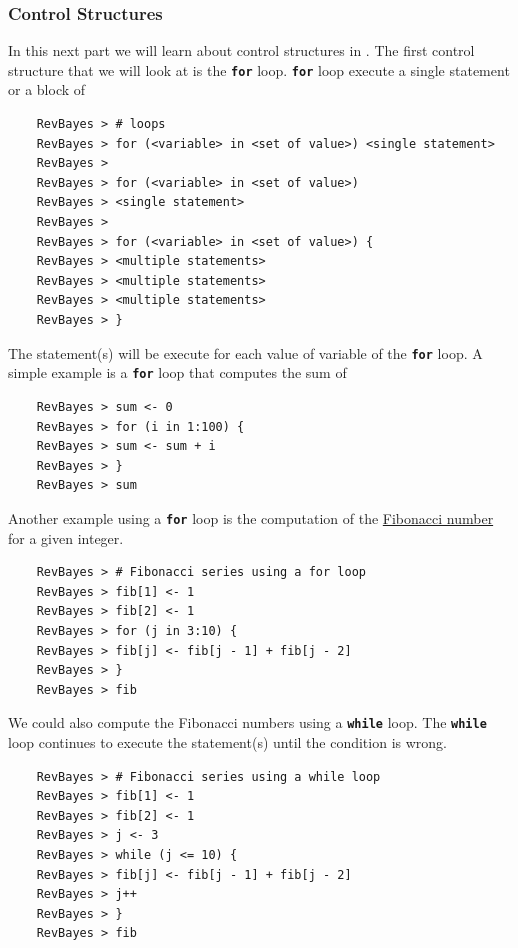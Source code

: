 \documentclass[11pt]{article}
\newcommand{\cl}[1]{{\texttt{\textbf{#1}}}}
\begin{document}
\subsubsection*{Control Structures}
In this next part we will learn about control structures in \Rev. 
The first control structure that we will look at is the \cl{for} loop.
\cl{for} loop execute a single statement or a block of 
{\tt \begin{snugshade*}
\begin{lstlisting}    
    RevBayes > # loops
    RevBayes > for (<variable> in <set of value>) <single statement>
    RevBayes > 
    RevBayes > for (<variable> in <set of value>) 
    RevBayes > <single statement>
    RevBayes >
    RevBayes > for (<variable> in <set of value>) {
    RevBayes > <multiple statements>
    RevBayes > <multiple statements>
    RevBayes > <multiple statements>
    RevBayes > }
\end{lstlisting}
\end{snugshade*}}
The statement(s) will be execute for each value of variable of the \cl{for} loop.
A simple example is a \cl{for} loop that computes the sum of 
{\tt \begin{snugshade*}
\begin{lstlisting}    
    RevBayes > sum <- 0
    RevBayes > for (i in 1:100) {
    RevBayes > sum <- sum + i
    RevBayes > }
    RevBayes > sum
\end{lstlisting}
\end{snugshade*}}
Another example using a \cl{for} loop is the computation of the \href{http://en.wikipedia.org/wiki/Fibonacci_number}{Fibonacci number} for a given integer. 
{\tt \begin{snugshade*}
\begin{lstlisting}    
    RevBayes > # Fibonacci series using a for loop
    RevBayes > fib[1] <- 1
    RevBayes > fib[2] <- 1
    RevBayes > for (j in 3:10) {
    RevBayes > fib[j] <- fib[j - 1] + fib[j - 2]
    RevBayes > }
    RevBayes > fib
\end{lstlisting}
\end{snugshade*}}
We could also compute the Fibonacci numbers using a \cl{while} loop.
The \cl{while} loop continues to execute the statement(s) until the condition is wrong.
{\tt \begin{snugshade*}
\begin{lstlisting}    
    RevBayes > # Fibonacci series using a while loop
    RevBayes > fib[1] <- 1
    RevBayes > fib[2] <- 1
    RevBayes > j <- 3
    RevBayes > while (j <= 10) {
    RevBayes > fib[j] <- fib[j - 1] + fib[j - 2]
    RevBayes > j++
    RevBayes > }
    RevBayes > fib
\end{lstlisting}
\end{snugshade*}}
\end{document}
